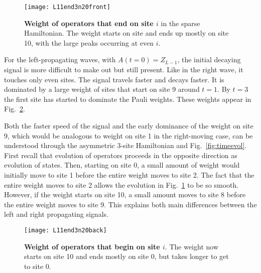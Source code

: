\begin{figure}
	\centering
	\texttt{[image: L11end3n20front]}
	\caption{\textbf{Weight of operators that end on site $i$} in the sparse Hamiltonian. The weight starts on site and ends up mostly on site 10, with the large peaks occurring at even $i$.}
	\label{fig:L11end3n20front}
\end{figure}

For the left-propagating waves, with $A(t=0)=Z_{L-1}$, the initial decaying signal is more difficult to make out but still present. Like in the right wave, it touches only even sites. The signal travels faster and decays faster. It is dominated by a large weight of sites that start on site 9 around $t=1$. By $t = 3$ the first site has started to dominate the Pauli weights. These weights appear in Fig.~\ref{fig:L11end3n20back}.

Both the faster speed of the signal and the early dominance of the weight on site 9, which would be analogous to weight on site 1 in the right-moving case, can be understood through the asymmetric 3-site Hamiltonian and Fig.~\ref{fig:timeevol}. First recall that evolution of operators proceeds in the opposite direction as evolution of states. Then, starting on site 0, a small amount of weight would initially move to site 1 before the entire weight moves to site 2. The fact that the entire weight moves to site 2 allows the evolution in Fig.~\ref{fig:L11end3n20front} to be so smooth. However, if the weight starts on site 10, a small amount moves to site 8 before the entire weight moves to site 9. This explains both main differences between the left and right propagating signals.

\begin{figure}
	\centering
	\texttt{[image: L11end3n20back]}
	\caption{\textbf{Weight of operators that begin on site $i$}. The weight now starts on site 10 and ends mostly on site 0, but takes longer to get to site 0.}
	\label{fig:L11end3n20back}
\end{figure}

